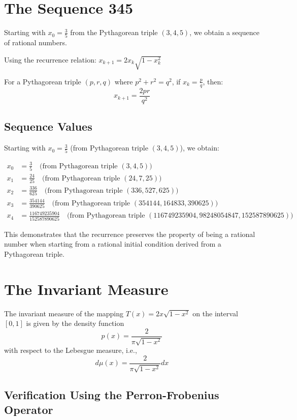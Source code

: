\documentclass[12pt,a4paper]{article}
\begin{document}
\section{The Sequence 345}

Starting with $x_0 = \frac{3}{5}$ from the Pythagorean triple $(3, 4, 5)$, we obtain a sequence of rational numbers.

Using the recurrence relation: $x_{k+1} = 2x_k\sqrt{1 - x_k^2}$

For a Pythagorean triple $(p, r, q)$ where $p^2 + r^2 = q^2$, if $x_k = \frac{p}{q}$, then:
\[
x_{k+1} = \frac{2pr}{q^2}
\]

\subsection{Sequence Values}

Starting with $x_0 = \frac{3}{5}$ (from Pythagorean triple $(3, 4, 5)$), we obtain:

\begin{align*}
x_0 &= \frac{3}{5} \quad \text{(from Pythagorean triple $(3, 4, 5)$)} \\
x_1 &= \frac{24}{25} \quad \text{(from Pythagorean triple $(24, 7, 25)$)} \\
x_2 &= \frac{336}{625} \quad \text{(from Pythagorean triple $(336, 527, 625)$)} \\
x_3 &= \frac{354144}{390625} \quad \text{(from Pythagorean triple $(354144, 164833, 390625)$)} \\
x_4 &= \frac{116749235904}{152587890625} \quad \text{(from Pythagorean triple $(116749235904, 98248054847, 152587890625)$)}
\end{align*}

This demonstrates that the recurrence preserves the property of being a rational number when starting from a rational initial condition derived from a Pythagorean triple.

\section{The Invariant Measure}

The invariant measure of the mapping $T(x) = 2x\sqrt{1-x^2}$ on the interval $[0, 1]$ is given by the density function 
\[
p(x) = \frac{2}{\pi\sqrt{1-x^2}}
\]
with respect to the Lebesgue measure, i.e., 
\[
d\mu(x) = \frac{2}{\pi\sqrt{1-x^2}}dx
\]

\subsection{Verification Using the Perron-Frobenius Operator}
\end{document}
